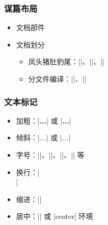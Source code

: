 \begin{frame}[fragile]
\frametitle{谋篇布局}
\begin{itemize}
  \item 文档部件


  \item 文档划分

    \begin{itemize}
      \item 凤头猪肚豹尾：|\frontmatter|、|\mainmatter|、|\backmatter|
      \item 分文件编译：||、||
    \end{itemize}
\end{itemize}
\end{frame}

\begin{frame}[fragile]
\frametitle{文本标记}
\begin{itemize}
  \item 加粗：|{\bfseries ...}| 或 |\textbf{...}|
  \item 倾斜：|{\itshape ...}| 或 |\textit{...}|
  \item 字号：|\tiny|、|\small|、|\large|、|\Large| 等
  \item 换行：|\\|
  \item 缩进：|\indent|
  \item 居中：|\centering| 或 |center| 环境
\end{itemize}
\end{frame}

